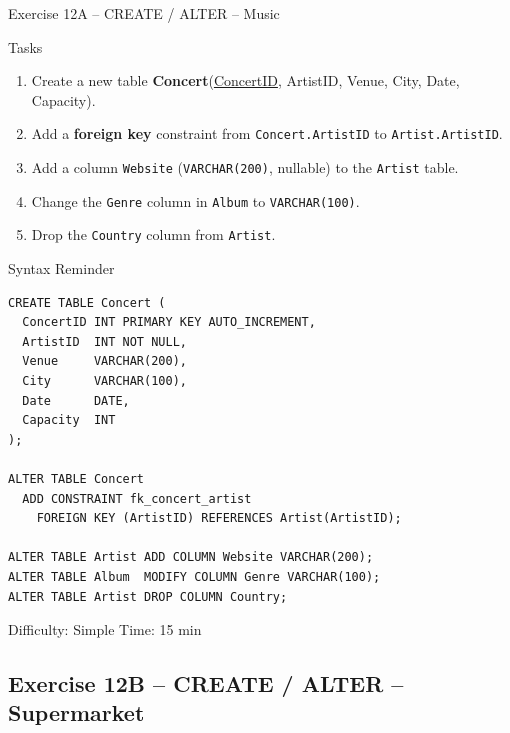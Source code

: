 \documentclass[10pt]{beamer}
\begin{document}
\begin{frame}[fragile]{Exercise 12A -- CREATE / ALTER -- Music}
  \begin{block}{Tasks}
    \begin{enumerate}
      \item Create a new table \textbf{Concert}(\underline{ConcertID}, ArtistID, Venue, City, Date, Capacity).
      \item Add a \textbf{foreign key} constraint from \texttt{Concert.ArtistID} to \texttt{Artist.ArtistID}.
      \item Add a column \texttt{Website} (\texttt{VARCHAR(200)}, nullable) to the \texttt{Artist} table.
      \item Change the \texttt{Genre} column in \texttt{Album} to \texttt{VARCHAR(100)}.
      \item Drop the \texttt{Country} column from \texttt{Artist}.
    \end{enumerate}
  \end{block}

  \begin{block}{Syntax Reminder}
\begin{lstlisting}[style=sqlstyle]
CREATE TABLE Concert (
  ConcertID INT PRIMARY KEY AUTO_INCREMENT,
  ArtistID  INT NOT NULL,
  Venue     VARCHAR(200),
  City      VARCHAR(100),
  Date      DATE,
  Capacity  INT
);

ALTER TABLE Concert
  ADD CONSTRAINT fk_concert_artist
    FOREIGN KEY (ArtistID) REFERENCES Artist(ArtistID);

ALTER TABLE Artist ADD COLUMN Website VARCHAR(200);
ALTER TABLE Album  MODIFY COLUMN Genre VARCHAR(100);
ALTER TABLE Artist DROP COLUMN Country;
\end{lstlisting}
  \end{block}

  \begin{alertblock}{Difficulty: Simple \quad Time: 15 min}
  \end{alertblock}
\end{frame}

\subsection{Exercise 12B -- CREATE / ALTER -- Supermarket}
\end{document}
